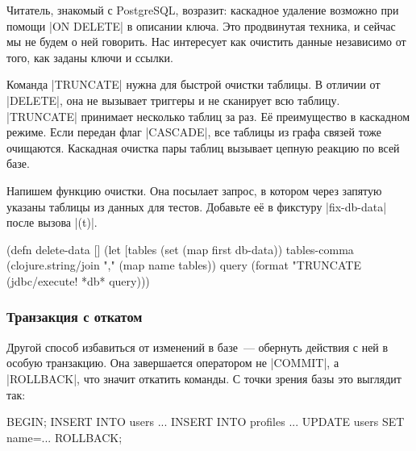 
Читатель, знакомый с PostgreSQL, возразит: каскадное удаление возможно при
помощи \spverb|ON DELETE| в описании ключа. Это продвинутая техника, и сейчас
мы не будем о ней говорить. Нас интересует как очистить данные независимо от
того, как заданы ключи и ссылки.


Команда \spverb|TRUNCATE|  нужна для быстрой очистки таблицы. В
отличии от \spverb|DELETE|, она не вызывает триггеры и не сканирует всю
таблицу. \spverb|TRUNCATE| принимает несколько таблиц за раз. Е\"{е}
преимущество в каскадном режиме. Если передан флаг \spverb|CASCADE|, все таблицы
из графа связей тоже очищаются. Каскадная очистка пары таблиц вызывает цепную
реакцию по всей базе.


Напишем функцию очистки. Она посылает запрос, в котором через запятую указаны
таблицы из данных для тестов. Добавьте е\"{е} в фикстуру \spverb|fix-db-data| после
вызова \spverb|(t)|.

\begin{english}
  \begin{clojure}
(defn delete-data []
  (let [tables (set (map first db-data))
        tables-comma (clojure.string/join "," (map name tables))
        query (format "TRUNCATE %
    (jdbc/execute! *db* query)))
  \end{clojure}
\end{english}

\subsubsection*{Транзакция с откатом}



Другой способ избавиться от изменений в базе~--- обернуть действия с ней в
особую транзакцию. Она завершается оператором не \spverb|COMMIT|, а
\spverb|ROLLBACK|, что значит откатить команды. С точки зрения базы это
выглядит так:

\begin{english}
  \begin{sql}
BEGIN;
INSERT INTO users ...
INSERT INTO profiles ...
UPDATE users SET name=...
ROLLBACK;
  \end{sql}
\end{english}

